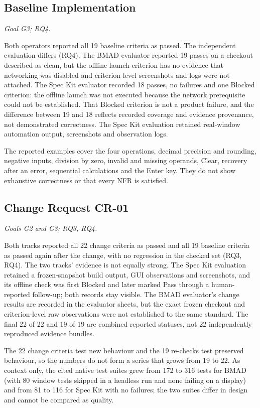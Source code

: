 \documentclass[conference]{IEEEtran}
\begin{document}
\subsection{Baseline Implementation}\label{baseline-implementation}

\emph{Goal G3; RQ4.}

Both operators reported all 19 baseline criteria as passed. The
independent evaluation differs (RQ4). The BMAD evaluator reported 19
passes on a checkout described as clean, but the offline-launch
criterion has no evidence that networking was disabled and
criterion-level screenshots and logs were not attached. The Spec Kit
evaluator recorded 18 passes, no failures and one Blocked criterion: the
offline launch was not executed because the network prerequisite could
not be established. That Blocked criterion is not a product failure, and
the difference between 19 and 18 reflects recorded coverage and evidence
provenance, not demonstrated correctness. The Spec Kit evaluation
retained real-window automation output, screenshots and observation
logs.

The reported examples cover the four operations, decimal precision and
rounding, negative inputs, division by zero, invalid and missing
operands, Clear, recovery after an error, sequential calculations and
the Enter key. They do not show exhaustive correctness or that every NFR
is satisfied.

\subsection{Change Request CR-01}\label{change-request-cr-01}

\emph{Goals G2 and G3; RQ3, RQ4.}

Both tracks reported all 22 change criteria as passed and all 19
baseline criteria as passed again after the change, with no regression
in the checked set (RQ3, RQ4). The two tracks' evidence is not equally
strong. The Spec Kit evaluation retained a frozen-snapshot build output,
GUI observations and screenshots, and its offline check was first
Blocked and later marked Pass through a human-reported follow-up; both
records stay visible. The BMAD evaluator's change results are recorded
in the evaluator sheets, but the exact frozen checkout and
criterion-level raw observations were not established to the same
standard. The final 22 of 22 and 19 of 19 are combined reported
statuses, not 22 independently reproduced evidence bundles.

The 22 change criteria test new behaviour and the 19 re-checks test
preserved behaviour, so the numbers do not form a series that grows from
19 to 22. As context only, the cited native test suites grew from 172 to
316 tests for BMAD (with 80 window tests skipped in a headless run and
none failing on a display) and from 81 to 116 for Spec Kit with no
failures; the two suites differ in design and cannot be compared as
quality.
\end{document}
